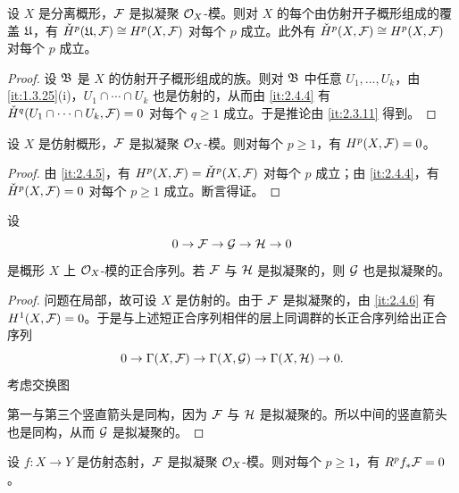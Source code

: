 \begin{corollary}\label{it:2.4.5}
设 $X$ 是分离概形，$\mathcal{F}$ 是拟凝聚 $\mathcal{O}_X$-模。则对 $X$ 的每个由仿射开子概形组成的覆盖 $\mathfrak{U}$，有 $\check{H}^p(\mathfrak{U},\mathcal{F})\cong H^p(X,\mathcal{F})$ 对每个 $p$ 成立。此外有 $\check{H}^p(X,\mathcal{F})\cong H^p(X,\mathcal{F})$ 对每个 $p$ 成立。
\end{corollary}

\begin{proof}
设 $\mathfrak{B}$ 是 $X$ 的仿射开子概形组成的族。则对 $\mathfrak{B}$ 中任意 $U_1,\dots,U_k$，由 \ref{it:1.3.25}(i)，$U_1\cap\cdots\cap U_k$ 也是仿射的，从而由 \ref{it:2.4.4} 有 $\check{H}^q(U_1\cap\cdots\cap U_k,\mathcal{F})=0$ 对每个 $q\ge 1$ 成立。于是推论由 \ref{it:2.3.11} 得到。
\end{proof}

\begin{theorem}\label{it:2.4.6}
设 $X$ 是仿射概形，$\mathcal{F}$ 是拟凝聚 $\mathcal{O}_X$-模。则对每个 $p\ge 1$，有 $H^p(X,\mathcal{F})=0$。
\end{theorem}

\begin{proof}
由 \ref{it:2.4.5}，有 $H^p(X,\mathcal{F})=\check{H}^p(X,\mathcal{F})$ 对每个 $p$ 成立；由 \ref{it:2.4.4}，有 $\check{H}^p(X,\mathcal{F})=0$ 对每个 $p\ge 1$ 成立。断言得证。
\end{proof}

\begin{corollary}\label{it:2.4.7}
设
\[
0\to\mathcal{F}\to\mathcal{G}\to\mathcal{H}\to 0
\]
是概形 $X$ 上 $\mathcal{O}_X$-模的正合序列。若 $\mathcal{F}$ 与 $\mathcal{H}$ 是拟凝聚的，则 $\mathcal{G}$ 也是拟凝聚的。
\end{corollary}

\begin{proof}
问题在局部，故可设 $X$ 是仿射的。由于 $\mathcal{F}$ 是拟凝聚的，由 \ref{it:2.4.6} 有 $H^1(X,\mathcal{F})=0$。于是与上述短正合序列相伴的层上同调群的长正合序列给出正合序列
\[
0\to\Gamma(X,\mathcal{F})\to\Gamma(X,\mathcal{G})\to\Gamma(X,\mathcal{H})\to 0.
\]
考虑交换图
\begin{center}
\end{center}
第一与第三个竖直箭头是同构，因为 $\mathcal{F}$ 与 $\mathcal{H}$ 是拟凝聚的。所以中间的竖直箭头也是同构，从而 $\mathcal{G}$ 是拟凝聚的。
\end{proof}

\begin{corollary}\label{it:2.4.8}
设 $f\colon X\to Y$ 是仿射态射，$\mathcal{F}$ 是拟凝聚 $\mathcal{O}_X$-模。则对每个 $p\ge 1$，有 $R^pf_*\mathcal{F}=0$。
\end{corollary}

